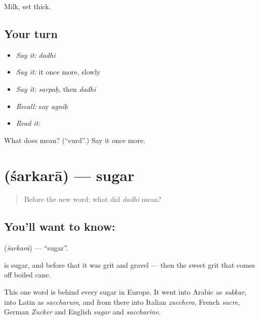 \begin{grammarlens}[title={What you've built}]
Milk, set thick.
\end{grammarlens}

\subsection*{Your turn}
\begin{itemize}
\raggedright
  \item \emph{Say it:} \emph{dadhi}
  \item \emph{Say it:} it once more, slowly
  \item \emph{Say it:} \emph{sarpaḥ}, then \emph{dadhi}
  \item \emph{Recall:} say \emph{agniḥ}
  \item \emph{Read it:} \textbf{}
\end{itemize}

\begin{tcolorbox}[breakable,colback=teal!4,colframe=teal!35!black,title={Before you move on}]
What does  mean? (\textquotedblleft{}curd\textquotedblright{}.) Say it once more.
\end{tcolorbox}
\section[\texorpdfstring{\sk{शर्करा} (śarkarā)}{शर्करा (śarkarā)}]{ (śarkarā) — sugar}

\label{lesson:SA-C40-sugar}



\begin{quote}
Before the new word: what did \emph{dadhi} mean?
\end{quote}

\subsection*{You'll want to know: }
\textbf{} (\emph{śarkarā}) — \textquotedblleft{}sugar\textquotedblright{}.

\textbf{} is sugar, and before that it was grit and gravel — then the sweet grit that comes off boiled cane.

This one word is behind every sugar in Europe. It went into Arabic as \emph{sukkar}, into Latin as \emph{saccharum}, and from there into Italian \emph{zucchero}, French \emph{sucre}, German \emph{Zucker} and English \emph{sugar} and \emph{saccharine}.

